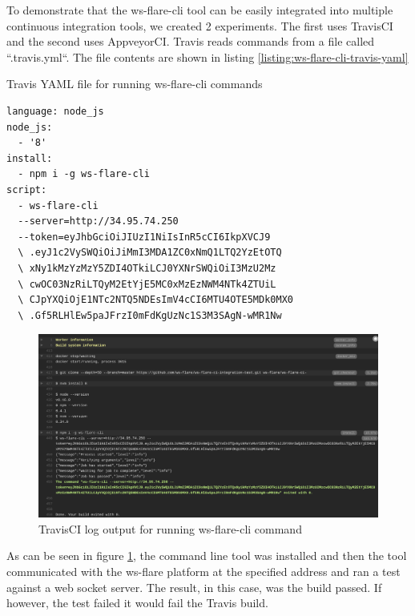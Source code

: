 To demonstrate that the ws-flare-cli tool can be easily integrated into multiple continuous integration tools, we created 2 experiments. The first uses TravisCI and the second uses AppveyorCI. Travis reads commands from a file called ``.travis.yml``. The file contents are shown in listing \ref{listing:ws-flare-cli-travis-yaml}

\begin{listing}[H]
    \caption{Travis YAML file for running ws-flare-cli commands}
    \label{listing:ws-flare-cli-travis-yaml}
    \begin{verbatim}
language: node_js
node_js:
  - '8'
install:
  - npm i -g ws-flare-cli
script:
  - ws-flare-cli 
  --server=http://34.95.74.250 
  --token=eyJhbGciOiJIUzI1NiIsInR5cCI6IkpXVCJ9
  \ .eyJ1c2VySWQiOiJiMmI3MDA1ZC0xNmQ1LTQ2YzEtOTQ
  \ xNy1kMzYzMzY5ZDI4OTkiLCJ0YXNrSWQiOiI3MzU2Mz
  \ cwOC03NzRiLTQyM2EtYjE5MC0xMzEzNWM4NTk4ZTUiL
  \ CJpYXQiOjE1NTc2NTQ5NDEsImV4cCI6MTU4OTE5MDk0MX0
  \ .Gf5RLHlEw5paJFrzI0mFdKgUzNc1S3M3SAgN-wMR1Nw
\end{verbatim}
\end{listing}

\begin{figure}[H]
  \centering
    \includegraphics[width=1\textwidth]{figures/experiments/experiment-3/travis-output.png}
    \caption{TravisCI log output for running ws-flare-cli command}
    \label{fig:experiment-3-travis-log}
\end{figure}

As can be seen in figure \ref{fig:experiment-3-travis-log}, the command line tool was installed and then the tool communicated with the ws-flare platform at the specified address and ran a test against a web socket server. The result, in this case, was the build passed. If however, the test failed it would fail the Travis build. 

